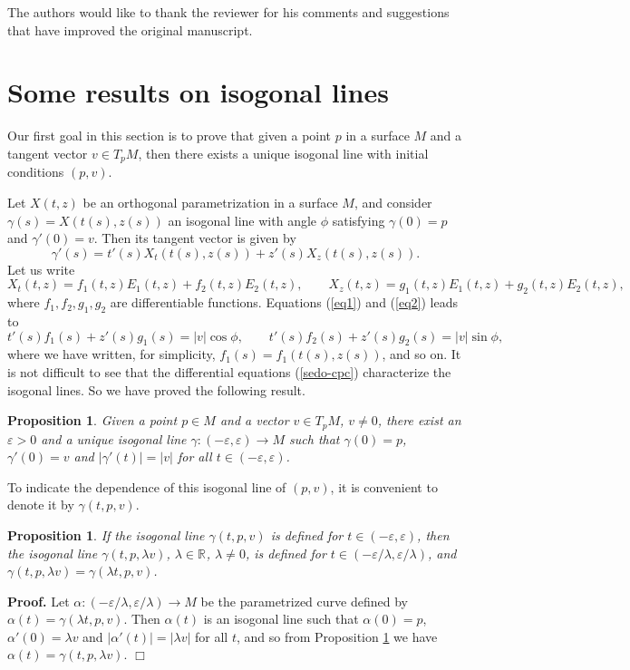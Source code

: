 \documentclass[11pt,a4paper]{article}
\def\e{\varepsilon}
\def\e{\varepsilon}
\def\R#1{\ensuremath{\mathbb{R}^{#1}}}
\def\e{\varepsilon}
\def\g{\gamma}
\newenvironment{proof}{\ignorespaces\par\noindent\textbf{Proof.}\quad}{\hfill$\Box$\par}
\newtheorem{prop}[theo]{Proposition}
\begin{document}
The authors would like to thank the reviewer for his comments and suggestions that have improved the original manuscript.

\section{Some results on isogonal lines}
\label{s:CCS}\label{s:NIL}

Our first goal in this section is to prove that given a point $p$ in a surface $M$ and a tangent vector $v\in T_pM$, then there exists a unique isogonal line with initial conditions $(p,v)$.

Let $X(t,z)$ be an orthogonal parametrization in a surface $M$, and consider $\g(s)=X(t(s),z(s))$ an isogonal line with angle $\phi$ satisfying $\g(0)=p$ and $\g'(0)=v$. Then its tangent vector is given by
\begin{equation}\label{eq1}
\g'(s)=t'(s)X_t(t(s),z(s))+z'(s)X_z(t(s),z(s)).
\end{equation}
Let us write
\begin{equation}\label{eq2}
X_t(t,z)=f_1(t,z)E_1(t,z)+f_2(t,z)E_2(t,z),\qquad
X_z(t,z)=g_1(t,z)E_1(t,z)+g_2(t,z)E_2(t,z),
\end{equation}
where $f_1,f_2,g_1,g_2$ are differentiable functions. Equations (\ref{eq1}) and (\ref{eq2}) leads to
\begin{equation}\label{sedo-cpc}
t'(s)f_1(s)+z'(s)g_1(s)=|v|\cos\phi,\qquad t'(s)f_2(s)+z'(s)g_2(s)=|v|\sin\phi,
\end{equation}
where we have written, for simplicity, $f_1(s)=f_1(t(s),z(s))$, and so on. It is not difficult to see that the differential equations (\ref{sedo-cpc}) characterize the  isogonal lines. So we have proved the following result.

\begin{prop}\label{p1.a}
Given a point $p\in M$ and a vector $v\in T_pM$, $v\neq0$, there exist an $\e>0$ and a unique  isogonal line $\gamma:(-\e,\e)\to M$ such that $\g(0)=p$, $\g'(0)=v$ and $|\g'(t)|=|v|$ for all $t\in(-\e,\e)$.
\end{prop}
To indicate the dependence of this isogonal line of $(p,v)$, it is convenient to denote it by $\g(t,p,v)$.

\begin{prop}\label{p1.b}
If the  isogonal line $\g(t,p,v)$ is defined for $t\in(-\e,\e)$, then the isogonal line $\g(t,p,\lambda v)$, $\lambda\in\R{}$, $\lambda\neq0$, is defined for $t\in(-\e/\lambda,\e/\lambda)$, and $\g(t,p,\lambda v)=\g(\lambda t,p,v)$.
\end{prop}
\begin{proof}
Let $\alpha:(-\e/\lambda,\e/\lambda)\to M$ be the parametrized curve defined by $\alpha(t)=\g(\lambda t,p,v)$. Then $\alpha(t)$ is an isogonal line such that $\alpha(0)=p$, $\alpha'(0)=\lambda v$ and $|\alpha'(t)|=|\lambda v|$ for all $t$, and so from Proposition \ref{p1.a} we have $\alpha(t)=\g(t,p,\lambda v)$.
\end{proof}
\end{document}
